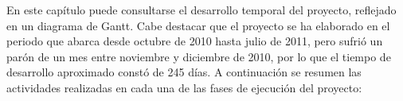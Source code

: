 



En este capítulo puede consultarse el desarrollo temporal del proyecto, reflejado en un diagrama de Gantt. Cabe destacar que el proyecto se ha elaborado en el periodo que abarca desde octubre de 2010 hasta julio de 2011, pero sufrió un parón de un mes entre noviembre y diciembre de 2010, por lo que el tiempo de desarrollo aproximado constó de 245 días. A continuación se resumen las actividades realizadas en cada una de las fases de ejecución del proyecto:

